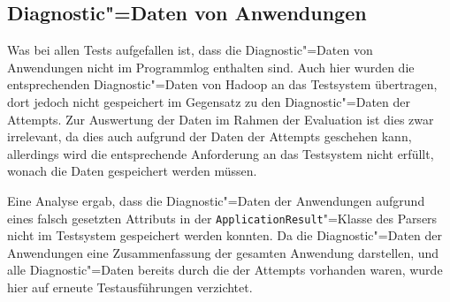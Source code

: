 \subsection{Diagnostic"=Daten von Anwendungen}
\label{sec:notSavedAppDiagnostics}

Was bei allen Tests aufgefallen ist, dass die Diagnostic"=Daten von Anwendungen nicht im Programmlog enthalten sind.
Auch hier wurden die entsprechenden Diagnostic"=Daten von Hadoop an das Testsystem übertragen, dort jedoch nicht gespeichert im Gegensatz zu den Diagnostic"=Daten der Attempts.
Zur Auswertung der Daten im Rahmen der Evaluation ist dies zwar irrelevant, da dies auch aufgrund der Daten der Attempts geschehen kann, allerdings wird die entsprechende Anforderung an das Testsystem nicht erfüllt, wonach die Daten gespeichert werden müssen.

Eine Analyse ergab, dass die Diagnostic"=Daten der Anwendungen aufgrund eines falsch gesetzten Attributs in der \texttt{ApplicationResult}"=Klasse des Parsers nicht im Testsystem gespeichert werden konnten. 
Da die Diagnostic"=Daten der Anwendungen eine Zusammenfassung der gesamten Anwendung darstellen, und alle Diagnostic"=Daten bereits durch die der Attempts vorhanden waren, wurde hier auf erneute Testausführungen verzichtet.
